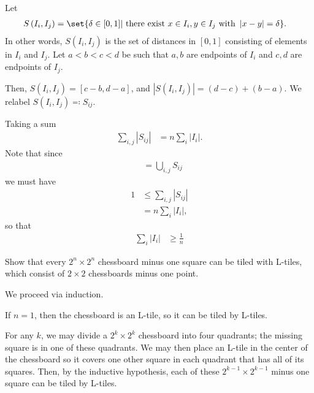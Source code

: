 \documentclass[10pt]{mypackage}
\begin{document}
\begin{solution}
  Let
  \begin{align*}
    S\left( I_i,I_j \right) &= \set{\delta\in [0,1] | \text{ there exist }x\in I_i,y\in I_j\text{ with }\left\vert x-y \right\vert = \delta}.
  \end{align*}
  In other words, $S\left( I_i,I_j \right)$ is the set of distances in $[0,1]$ consisting of elements in $I_i$ and $I_j$. Let $a < b < c < d$ be such that $a,b$ are endpoints of $I_i$ and $c,d$ are endpoints of $I_j$.\newline

  Then, $S\left( I_i,I_j \right) = \left[ c-b,d-a \right]$, and $\left\vert S\left( I_i,I_j \right) \right\vert = \left( d-c \right) + \left( b-a \right)$. We relabel $S\left( I_i,I_j \right) \eqcolon S_{ij}$.\newline

  Taking a sum
  \begin{align*}
    \sum_{i, j}\left\vert S_{ij} \right\vert &= n\sum_{i}\left\vert I_i \right\vert.
  \end{align*}
  Note that since
  \begin{align*}
    [0,1] &= \bigcup_{i,j}S_{ij}
  \end{align*}
  we must have
  \begin{align*}
    1 &\leq \sum_{i,j}\left\vert S_{ij} \right\vert\\
      &= n\sum_{i}\left\vert I_i \right\vert,
  \end{align*}
  so that
  \begin{align*}
    \sum_{i} \left\vert I_i \right\vert &\geq \frac{1}{n}
  \end{align*}
\end{solution}

\begin{problem}
  Show that every $2^{n}\times 2^{n}$ chessboard minus one square can be tiled with L-tiles, which consist of $2\times 2$ chessboards minus one point.
\end{problem}
\begin{solution}
  We proceed via induction.\newline

  If $n = 1$, then the chessboard is an L-tile, so it can be tiled by L-tiles.\newline

  For any $k$, we may divide a $2^{k}\times 2^{k}$ chessboard into four quadrants; the missing square is in one of these quadrants. We may then place an L-tile in the center of the chessboard so it covers one other square in each quadrant that has all of its squares. Then, by the inductive hypothesis, each of these $2^{k-1}\times 2^{k-1}$ minus one square can be tiled by L-tiles.
\end{solution}
\end{document}
